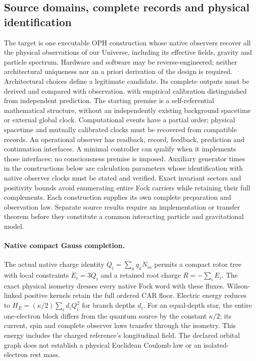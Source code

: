 \subsection{Source domains, complete records and physical identification}


The target is one executable OPH construction whose native observers recover
all the physical observations of our Universe, including its effective fields,
gravity and particle spectrum. Hardware and software may be reverse-engineered;
neither architectural uniqueness nor an a priori derivation of the design is
required. Architectural choices define a legitimate candidate. Its complete
outputs must be derived and compared with observation, with empirical
calibration distinguished from independent prediction.
The starting premise is a self-referential mathematical structure, without
an independently existing background spacetime or external global clock.
Computational events have a partial order; physical spacetime and mutually
calibrated clocks must be recovered from compatible records. An operational
observer has readback, record, feedback, prediction and continuation
interfaces. A minimal controller can qualify when it implements those
interfaces; no consciousness premise is imposed. Auxiliary generator times
in the constructions below are calculation parameters whose identification
with native observer clocks must be stated and verified.
Exact invariant sectors and positivity bounds avoid
enumerating entire Fock carriers while retaining their full complements.
Each construction supplies its own complete preparation and observation law.
Separate source results require an implementation or transfer theorem before
they constitute a common interacting particle and gravitational model.


\paragraph{Native compact Gauss completion.}
The actual native charge identity $Q_i=\sum_a q_aN_{ia}$ permits a compact
rotor tree with local constraints $E_i=3Q_i$ and a retained root charge
$R=-\sum_iE_i$. The exact physical isometry dresses every native Fock word
with these fluxes. Wilson-linked positive kernels retain the full ordered
CAR floor. Electric energy reduces to
$H_E=(\kappa/2)\sum_i d_iQ_i^2$ for branch depths $d_i$.
For an equal-depth star, the entire one-electron block differs from the
quantum source by the constant $\kappa/2$; its current, spin and complete
observer laws transfer through the isometry. This energy includes the charged
reference's longitudinal field. The declared orbital graph does not establish
a physical Euclidean Coulomb law or an isolated-electron rest mass.


